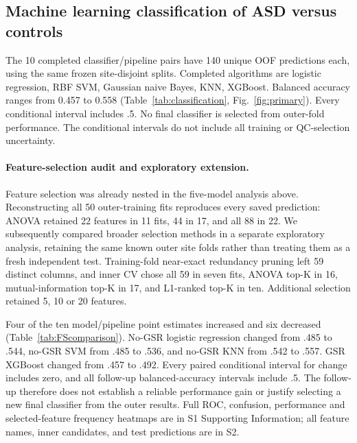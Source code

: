 \documentclass[10pt,letterpaper]{article}
\begin{document}
\subsection*{Machine learning classification of ASD versus controls}
The 10 completed classifier/pipeline pairs have 140 unique OOF predictions
each, using the same frozen site-disjoint splits. Completed algorithms are
logistic regression, RBF SVM, Gaussian naive Bayes, KNN, XGBoost. Balanced accuracy ranges from
0.457 to 0.558 (Table~\ref{tab:classification}, Fig.~\ref{fig:primary}).
Every conditional interval includes .5. No final classifier is selected from outer-fold performance.
The conditional intervals do not include all training or QC-selection uncertainty.



\paragraph*{Feature-selection audit and exploratory extension.}
Feature selection was already nested in the five-model analysis above. Reconstructing
all 50 outer-training fits reproduces every saved prediction: ANOVA retained 22
features in 11 fits, 44 in 17, and all 88 in 22. We subsequently compared broader
selection methods in a separate exploratory analysis, retaining the same known
outer site folds rather than treating them as a fresh independent test.
Training-fold near-exact redundancy pruning left 59 distinct columns, and inner
CV chose all 59 in seven fits, ANOVA top-K in 16, mutual-information top-K in 17,
and L1-ranked top-K in ten. Additional selection retained 5, 10 or 20 features.

Four of the ten model/pipeline point estimates increased and six decreased
(Table~\ref{tab:FScomparison}). No-GSR logistic regression changed from .485 to
.544, no-GSR SVM from .485 to .536, and no-GSR KNN from .542 to .557. GSR XGBoost
changed from .457 to .492. Every paired conditional interval for change includes
zero, and all follow-up balanced-accuracy intervals include .5. The follow-up
therefore does not establish a reliable performance gain or justify selecting a
new final classifier from the outer results. Full ROC, confusion, performance
and selected-feature frequency heatmaps are in S1 Supporting Information; all
feature names, inner candidates, and test predictions are in S2.


\end{document}
